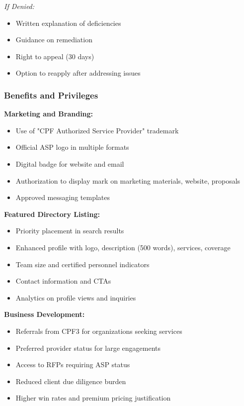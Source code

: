\documentclass[11pt,a4paper]{article}
\begin{document}
\textit{If Denied:}
\begin{itemize}
\item Written explanation of deficiencies
\item Guidance on remediation
\item Right to appeal (30 days)
\item Option to reapply after addressing issues
\end{itemize}

\subsubsection{Benefits and Privileges}

\textbf{Marketing and Branding:}
\begin{itemize}
\item Use of "CPF Authorized Service Provider" trademark
\item Official ASP logo in multiple formats
\item Digital badge for website and email
\item Authorization to display mark on marketing materials, website, proposals
\item Approved messaging templates
\end{itemize}

\textbf{Featured Directory Listing:}
\begin{itemize}
\item Priority placement in search results
\item Enhanced profile with logo, description (500 words), services, coverage
\item Team size and certified personnel indicators
\item Contact information and CTAs
\item Analytics on profile views and inquiries
\end{itemize}

\textbf{Business Development:}
\begin{itemize}
\item Referrals from CPF3 for organizations seeking services
\item Preferred provider status for large engagements
\item Access to RFPs requiring ASP status
\item Reduced client due diligence burden
\item Higher win rates and premium pricing justification
\end{itemize}
\end{document}

